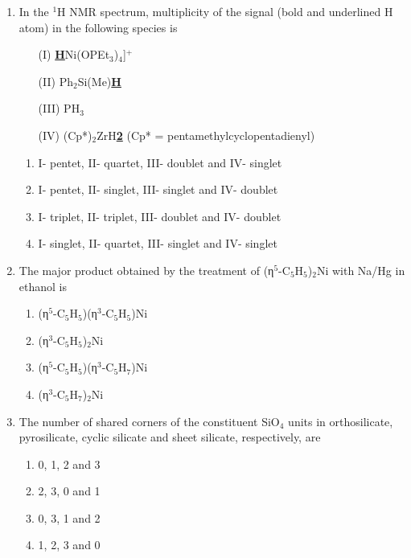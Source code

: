 \documentclass[journal,12pt,onecolumn]{IEEEtran}
\theoremstyle{remark}
\begin{document}
\begin{enumerate}
\item In the $^{1}$H NMR spectrum, multiplicity of the signal (bold and underlined H atom) in the following species is
\begin{multicols}{2}
\begin{enumerate}
\item[(I)] \textbf{\underline{H}}Ni(OPEt$_3$)$_4$]$^{+}$
\item[(II)] Ph$_2$Si(Me)\textbf{\underline{H}}
\item[(III)] PH$_3$
\item[(IV)] (Cp*)$_2$ZrH\textbf{\underline{2}} (Cp* = pentamethylcyclopentadienyl)
\end{enumerate}
\end{multicols}

\begin{multicols}{2}
\begin{enumerate}
\item I- pentet, II- quartet, III- doublet and IV- singlet
\item I- pentet, II- singlet, III- singlet and IV- doublet
\item I- triplet, II- triplet, III- doublet and IV- doublet
\item I- singlet, II- quartet, III- singlet and IV- singlet
\end{enumerate}
\end{multicols}

\item The major product obtained by the treatment of (η$^{5}$-C$_5$H$_5$)$_2$Ni with Na/Hg in ethanol is
\begin{multicols}{2}
\begin{enumerate}
\item (η$^{5}$-C$_5$H$_5$)(η$^{3}$-C$_5$H$_5$)Ni
\item (η$^{3}$-C$_5$H$_5$)$_2$Ni
\item (η$^{5}$-C$_5$H$_5$)(η$^{3}$-C$_5$H$_7$)Ni
\item (η$^{3}$-C$_5$H$_7$)$_2$Ni
\end{enumerate}
\end{multicols}




\item The number of shared corners of the constituent SiO$_4$ units in orthosilicate, pyrosilicate, cyclic silicate and sheet silicate, respectively, are
\begin{multicols}{2}
\begin{enumerate}
\item 0, 1, 2 and 3
\item 2, 3, 0 and 1
\item 0, 3, 1 and 2
\item 1, 2, 3 and 0
\end{enumerate}
\end{multicols}



\end{enumerate}
\end{document}

